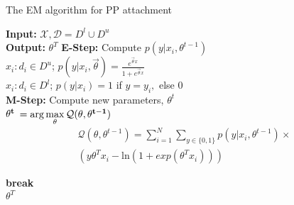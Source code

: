  \begin{algorithm}
 \caption{The EM algorithm  for PP attachment}
 \label{algorithm}
 \begin{algorithmic}
 \STATE \textbf{Input:}  $\mathcal{X}, \mathcal{D} = D^{l} \cup D^{u}$\\
 \STATE \textbf{Output:} $\theta^{T}$
   \STATE \textbf{E-Step:}
   \STATE Compute $p(y|x_i, \theta^{t-1})$\\
   \STATE $x_i: d_i\in D^u$; $p(y|x_i, \vec \theta)  =  \frac{e^{\vec \theta x}}{1+ e^{\vec \theta x}}$  \\
   \STATE $x_i: d_i \in D^{l}$; $p(y|x_i)= 1$ if  $y=y_i,$ else $0$ \\
   \STATE \textbf{M-Step:} 
   \STATE Compute new parameters, $\theta^{t}$\\
   \STATE ${\bf \theta^{t}}$ $=\arg\max\limits_{\theta}\mathcal{Q}({\bf\theta, \theta^{t-1})}$
   \vspace{-0.4cm}
   \begin{multline*}
    \mathcal{Q}(\theta,  \theta^{t-1})  =\sum_{i=1}^{N}\sum_{y\in\{0,1\}}   p(y|x_i,\theta^{t-1}) \times\\( y\theta^{T}x_i - \mbox {ln}  (1+ exp ( \theta^{T}x_i)) ) 
   \end{multline*}
    		
     	\STATE \textbf{break}\\
     \ENDIF
 \ENDFOR
 \RETURN $\theta^{T}$
 \end{algorithmic}
 \end{algorithm} 
 
 

